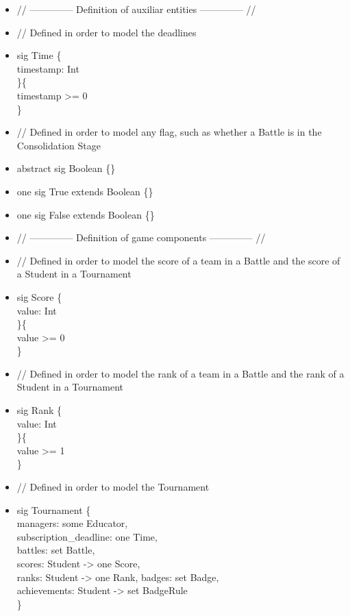 \documentclass{Configuration_Files/Template}
\begin{document}
\begin{itemize}
\item // -------------- Definition of auxiliar entities -------------- //\\

\item // Defined in order to model the deadlines
\item sig Time \{\\
timestamp: Int\\
\}\{\\
timestamp >= 0\\
\}\\

\item // Defined in order to model any flag, such as whether a Battle is in the Consolidation Stage
\item abstract sig Boolean \{\}
\item one sig True extends Boolean \{\}
\item one sig False extends Boolean \{\}\\

\item // -------------- Definition of game components -------------- //\\

\item // Defined in order to model the score of a team in a Battle and the score of a Student in a Tournament
\item sig Score \{\\
value: Int\\
\}\{\\
value >= 0\\
\}\\

\item // Defined in order to model the rank of a team in a Battle and the rank of a Student in a Tournament
\item sig Rank \{\\
value: Int\\
\}\{\\
value >= 1\\
\}\\

\item // Defined in order to model the Tournament
\item sig Tournament \{\\
managers: some Educator,\\
subscription\_deadline: one Time,\\
battles: set Battle,\\
scores: Student -> one Score,\\
ranks: Student -> one Rank,
badges: set Badge,\\
achievements: Student -> set BadgeRule\\
\}\\


\end{itemize}
\end{document}
